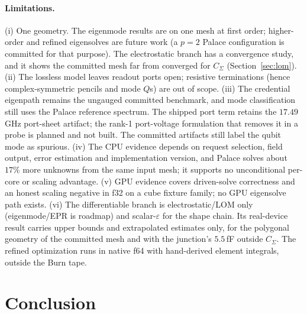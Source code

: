 \documentclass{anvil-paper}
\begin{document}
\paragraph{Limitations.}
(i) One geometry. The eigenmode results are on one mesh at first order;
higher-order and refined eigensolves are future work (a $p = 2$ Palace
configuration is committed for that purpose). The electrostatic branch
has a convergence study, and it shows the committed mesh far from
converged for $C_\Sigma$ (Section~\ref{sec:lom}). (ii) The lossless model
leaves readout ports open; resistive terminations (hence
complex-symmetric pencils and mode $Q$s) are out of scope. (iii) The
credential eigenpath remains the ungauged committed benchmark, and mode
classification still uses the Palace reference spectrum. The shipped
port term retains the $17.49$\,GHz port-sheet artifact; the rank-1
port-voltage formulation that removes it in a probe is planned and not
built. The committed artifacts still label the qubit mode as spurious. (iv) The CPU evidence depends on
request selection, field output, error estimation and implementation
version, and Palace solves about $17\%$ more unknowns from the same
input mesh; it supports no unconditional per-core or scaling advantage.
(v) GPU evidence covers
driven-solve correctness and an honest scaling negative in f32 on a
cube fixture family; no GPU eigensolve path exists. (vi) The
differentiable branch is electrostatic/LOM only (eigenmode/EPR is
roadmap) and scalar-$\varepsilon$ for the shape chain. Its real-device
result carries upper bounds and extrapolated estimates only, for the
polygonal geometry of the committed mesh and with the junction's
$5.5$\,fF outside $C_\Sigma$. The refined optimization runs in native
f64 with hand-derived element integrals, outside the Burn tape.

\section{Conclusion}
\label{sec:conclusion}
\end{document}
